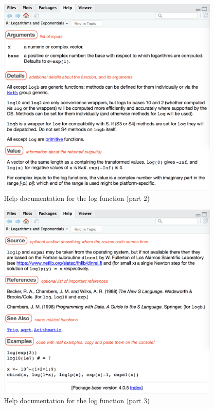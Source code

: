 \documentclass[
]{book}
\begin{document}
\begin{figure}

{\centering \includegraphics[width=0.8\linewidth]{images/rstudio/help-log-2} 

}

\caption{Help documentation for the log function (part 2)}\label{fig:unnamed-chunk-21}
\end{figure}

\begin{figure}

{\centering \includegraphics[width=0.8\linewidth]{images/rstudio/help-log-3} 

}

\caption{Help documentation for the log function (part 3)}\label{fig:unnamed-chunk-22}
\end{figure}
\end{document}
